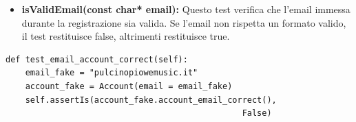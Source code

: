\begin{itemize}
    \item \textbf{isValidEmail(const char* email):}
    Questo test verifica che l'email immessa durante la registrazione sia valida. Se l'email non rispetta un formato valido, il test restituisce false, altrimenti restituisce true.
\end{itemize}
\begin{lstlisting}[caption={class AccountModelTests(TestCase)}, captionpos=b]
def test_email_account_correct(self):
    email_fake = "pulcinopiowemusic.it"
    account_fake = Account(email = email_fake)
    self.assertIs(account_fake.account_email_correct(), 
                                                False)
\end{lstlisting}

